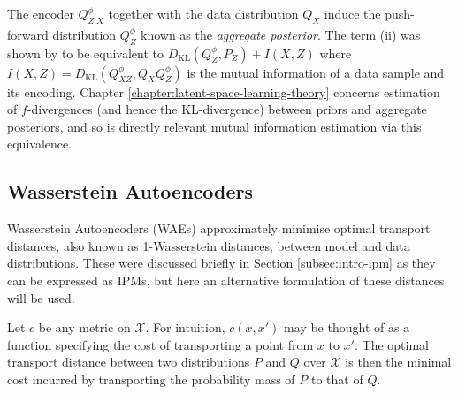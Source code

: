 The encoder $Q^\phi_{Z|X}$ together with the data distribution $Q_X$ induce the push-forward distribution $Q^\phi_Z$ known as the \emph{aggregate posterior}.
The term (ii) was shown by \cite{hoffman2016elbo} to be equivalent to $D_{\text{KL}}(Q^\phi_Z , P_Z) + I(X,Z)$ where $I(X,Z) = D_{\text{KL}}(Q^\phi_{XZ} , Q_XQ^\phi_{Z})$ is the mutual information of a data sample and its encoding.
Chapter \ref{chapter:latent-space-learning-theory} concerns estimation of $f$-divergences (and hence the KL-divergence) between priors and aggregate posteriors, and so is directly relevant mutual information estimation via this equivalence.





\subsection{Wasserstein Autoencoders}

Wasserstein Autoencoders (WAEs) \citep{tolstikhin2017wasserstein} approximately minimise optimal transport distances, also known as 1-Wasserstein distances, between model and data distributions.
These were discussed briefly in Section \ref{subsec:intro-ipm} as they can be expressed as IPMs, but here an alternative formulation of these distances will be used.

Let $c$ be any metric on $\mathcal{X}$.
For intuition, $c(x, x')$ may be thought of as a function specifying the cost of transporting a point from $x$ to $x'$.
The optimal transport distance between two distributions $P$ and $Q$ over $\mathcal{X}$ is then the minimal cost incurred by transporting the probability mass of $P$ to that of $Q$.

